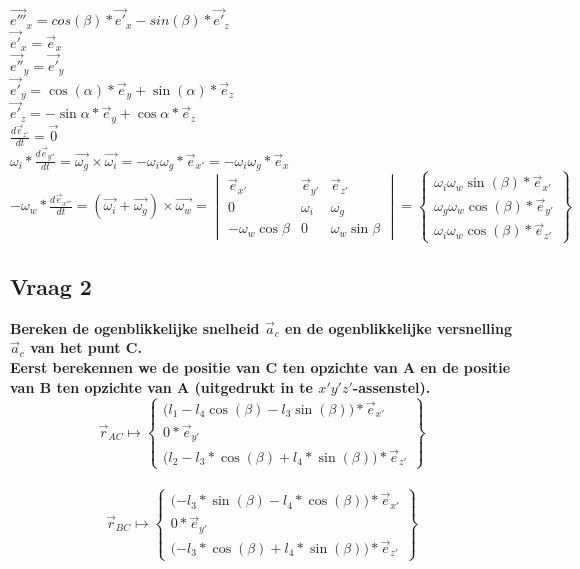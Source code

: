 \documentclass[a4paper,10pt]{article}
\begin{document}
\begin{center}
	$\vec{e'''}_{x} = cos(\beta) *\vec{e'}_{x} - sin(\beta) *\vec{e'}_{z}$\\
	$\vec{e'}_{x}=\vec{e}_{x}$\\
	$\vec{e''}_{y} = \vec{e'}_{y} $\\
	$\vec{e'}_{y} = \cos(\alpha)*\vec{e}_{y} + \sin(\alpha)*\vec{e}_z $\\
	$\vec{e'}_{z} = -\sin{\alpha}*\vec{e}_{y} + \cos{\alpha}*\vec{e}_z $\\
	$\frac{d\vec{e}_{z'}}{dt}=\vec{0}$\\
	$\omega_i * \frac{d\vec{e}_{y''}}{dt}=\vec{\omega_g}\times\vec{\omega_i} = -\omega_i \omega_g *\vec{e}_{x'} = -\omega_i \omega_g *\vec{e}_{x}  $\\
	$-\omega_w * \frac{d\vec{e}_{x'''}}{dt} = (\vec{\omega_i} + \vec{\omega_g})\times\vec{\omega_w} = \begin{vmatrix}
	\vec{e}_{x'}&\vec{e}_{y'}&\vec{e}_{z'}\\
	0 & \omega_i & \omega_g\\
	-\omega_w \cos{\beta} & 0 & \omega_w \sin{\beta}
	\end{vmatrix} = \begin{Bmatrix}
	\omega_i \omega_w \sin(\beta)  *\vec{e}_{x'} \\
	\omega_g \omega_w \cos(\beta) *\vec{e}_{y'}\\
	\omega_i \omega_w \cos(\beta) *\vec{e}_{z'}
	\end{Bmatrix}
	$
\end{center}
\subsection{Vraag 2}
\textbf{Bereken de ogenblikkelijke snelheid $\vec{a}_c$ en de ogenblikkelijke versnelling $\vec{a}_c$ van het punt C.}\\
\textbf{Eerst berekennen we de positie van C ten opzichte van A en de positie van B ten opzichte van A (uitgedrukt in te $x'y'z'$-assenstel).}
\begin{equation}
	\vec{r}_{AC} \mapsto \begin{Bmatrix}
		\Big({l_1 - l_4 \cos(\beta)-l_3 \sin(\beta)\Big)*\vec{e}_{x'}}\\
		0 * \vec{e}_{y'}\\
		\Big ({l_2 - l_3*\cos(\beta) + l_4 *\sin(\beta)\Big) * \vec{e}_{z'}}
	\end{Bmatrix}
\end{equation}\\
\begin{equation}
	\vec{r}_{BC} \mapsto \begin{Bmatrix}
		\Big({ - l_3 * \sin(\beta) - l_4 * \cos(\beta)\Big)*\vec{e}_{x'}}\\
		0 * \vec{e}_{y'}\\
		\Big ({ - l_3*\cos(\beta) + l_4 *\sin(\beta)\Big) * \vec{e}_{z'}}
	\end{Bmatrix}
\end{equation}\\
\end{document}
